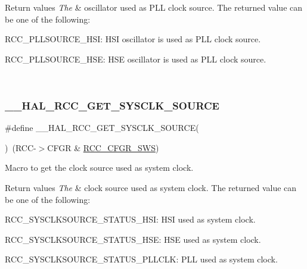 \begin{DoxyRetVals}{Return values}
{\em The} & oscillator used as P\+LL clock source. The returned value can be one of the following\+:
\begin{DoxyItemize}
\item R\+C\+C\+\_\+\+P\+L\+L\+S\+O\+U\+R\+C\+E\+\_\+\+H\+SI\+: H\+SI oscillator is used as P\+LL clock source.
\item R\+C\+C\+\_\+\+P\+L\+L\+S\+O\+U\+R\+C\+E\+\_\+\+H\+SE\+: H\+SE oscillator is used as P\+LL clock source. 
\end{DoxyItemize}\\
\hline
\end{DoxyRetVals}
\mbox{\label{group___r_c_c___get___clock__source_gac99c2453d9e77c8b457acc0210e754c2}} 
\subsubsection{\texorpdfstring{\_\_HAL\_RCC\_GET\_SYSCLK\_SOURCE}{\_\_HAL\_RCC\_GET\_SYSCLK\_SOURCE}}
{\footnotesize\ttfamily \#define \+\_\+\+\_\+\+H\+A\+L\+\_\+\+R\+C\+C\+\_\+\+G\+E\+T\+\_\+\+S\+Y\+S\+C\+L\+K\+\_\+\+S\+O\+U\+R\+CE(\begin{DoxyParamCaption}{ }\end{DoxyParamCaption})~(R\+CC-\/$>$C\+F\+GR \& \mbox{\hyperlink{group___peripheral___registers___bits___definition_ga15bf2269500dc97e137315f44aa015c9}{R\+C\+C\+\_\+\+C\+F\+G\+R\+\_\+\+S\+WS}})}



Macro to get the clock source used as system clock. 


\begin{DoxyRetVals}{Return values}
{\em The} & clock source used as system clock. The returned value can be one of the following\+:
\begin{DoxyItemize}
\item R\+C\+C\+\_\+\+S\+Y\+S\+C\+L\+K\+S\+O\+U\+R\+C\+E\+\_\+\+S\+T\+A\+T\+U\+S\+\_\+\+H\+SI\+: H\+SI used as system clock.
\item R\+C\+C\+\_\+\+S\+Y\+S\+C\+L\+K\+S\+O\+U\+R\+C\+E\+\_\+\+S\+T\+A\+T\+U\+S\+\_\+\+H\+SE\+: H\+SE used as system clock.
\item R\+C\+C\+\_\+\+S\+Y\+S\+C\+L\+K\+S\+O\+U\+R\+C\+E\+\_\+\+S\+T\+A\+T\+U\+S\+\_\+\+P\+L\+L\+C\+LK\+: P\+LL used as system clock. 
\end{DoxyItemize}\\
\hline
\end{DoxyRetVals}
\mbox{\label{group___r_c_c___get___clock__source_ga9e21c193560567cfc3f908d733d9b19b}} 
